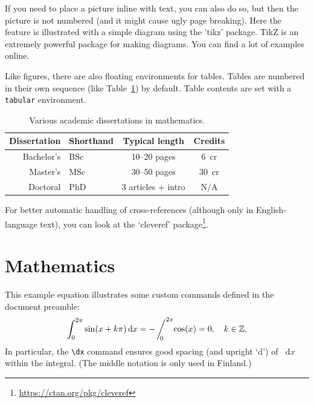 \documentclass[a4paper, 11pt]{report}
\theoremstyle{plain}
\theoremstyle{definition}
\theoremstyle{remark}
\newcommand{\ZZ}{\mathbb Z} %
\newcommand{\dx}{\mathop{}\!\mathrm d x} %
\newcommand{\sij}[2]{\mathop{\bigg/}\nolimits_{\hspace{-0.65em}#1}^{\hspace{0.05em}#2}\hspace{-0.2em}}
\begin{document}
If you need to place a picture inline with text,
you can also do so, but then the picture is not numbered (and it might cause ugly page breaking).
Here the feature is illustrated with a simple diagram using the 'tikz' package.
TikZ is an extremely powerful package for making diagrams.
You can find a lot of examples online.

\begin{center}
\end{center}


Like figures, there are also floating environments for tables.
Tables are numbered in their own sequence (like Table~\ref{tbl:theses}) by default.
Table contents are set with a \verb|tabular| environment.

\begin{table}
\centering
\begin{tabular}{r|lcc}
Dissertation & Shorthand & Typical length & Credits\\
\hline
Bachelor's & BSc & 10--20 pages & 6~cr\\
Master's & MSc & 30--50 pages & 30~cr\\
Doctoral & PhD & 3 articles + intro & N/A
\end{tabular}
\caption{Various academic dissertations in mathematics.}
\label{tbl:theses}
\end{table}

For better automatic handling of cross-references (although only in English-language text),
you can look at the `cleveref' package\footnote{\url{https://ctan.org/pkg/cleveref}}.



\section{Mathematics}

This example equation illustrates some custom commands defined in the document preamble:
\begin{equation}\label{eq:example}
\int_0^{2\pi} \sin(x + k\pi) \dx = -\sij{0}{2\pi} \cos(x) = 0,
\quad k \in \ZZ.
\end{equation}
In particular, the \verb|\dx| command ensures good spacing (and upright `d') of $\dx$ within the integral.
(The middle notation is only used in Finland.)
\end{document}
